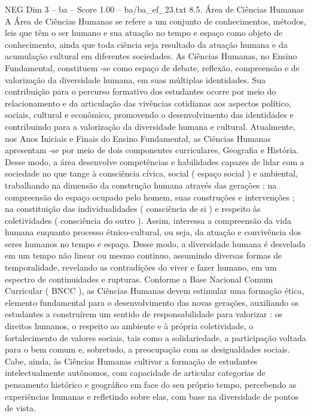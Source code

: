 \begin{textsample}{NEG Dim 3 – ba – Score 1.00 – ba/ba\_ef\_23.txt}  \label{ex:f3_neg_117}
8.5.
Área de Ciências Humanas A Área de Ciências Humanas se refere a um conjunto de conhecimentos, métodos, leis que têm o ser humano e sua atuação no tempo e espaço como objeto de conhecimento, ainda que toda ciência seja resultado da atuação humana e da acumulação cultural em diferentes sociedades.
As Ciências Humanas, no Ensino Fundamental, constituem -se como espaço de debate, reflexão, compreensão e de valorização da diversidade humana, em suas múltiplas identidades.
Sua contribuição para o percurso formativo dos estudantes ocorre por meio do relacionamento e da articulação das vivências cotidianas aos aspectos político, sociais, cultural e econômico, promovendo o desenvolvimento das identidades e contribuindo para a valorização da diversidade humana e cultural.
Atualmente, nos Anos Iniciais e Finais do Ensino Fundamental, as Ciências Humanas apresentam -se por meio de dois componentes curriculares, Geografia e História.
Desse modo, a área desenvolve competências e habilidades capazes de lidar com a sociedade no que tange à consciência cívica, social ( espaço social ) e ambiental, trabalhando na dimensão da construção humana através das gerações ; na compreensão do espaço ocupado pelo homem, suas construções e intervenções ; na constituição das individualidades ( consciência de si ) e respeito às coletividades ( consciência do outro ).
Assim, interessa a compreensão da vida humana enquanto processo étnico-cultural, ou seja, da atuação e convivência dos seres humanos no tempo e espaço.
Desse modo, a diversidade humana é desvelada em um tempo não linear ou mesmo continuo, assumindo diversas formas de temporalidade, revelando as contradições do viver e fazer humano, em um espectro de continuidades e rupturas.
Conforme a Base Nacional Comum Curricular ( BNCC ), as Ciências Humanas devem estimular uma formação ética, elemento fundamental para o desenvolvimento das novas gerações, auxiliando os estudantes a construírem um sentido de responsabilidade para valorizar : os direitos humanos, o respeito ao ambiente e à própria coletividade, o fortalecimento de valores sociais, tais como a solidariedade, a participação voltada para o bem comum e, sobretudo, a preocupação com as desigualdades sociais.
Cabe, ainda, às Ciências Humanas cultivar a formação de estudantes intelectualmente autônomos, com capacidade de articular categorias de pensamento histórico e geográfico em face do seu próprio tempo, percebendo as experiências humanas e refletindo sobre elas, com base na diversidade de pontos de vista.

\end{textsample}
